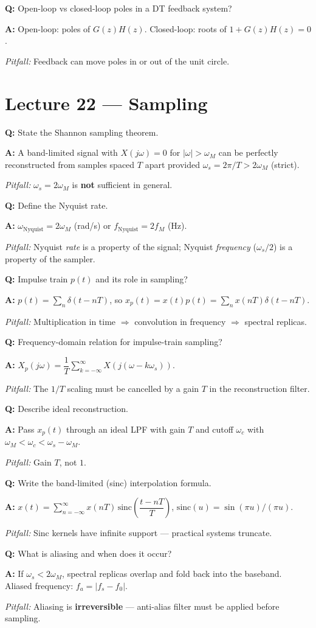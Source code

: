 \documentclass[11pt]{article}
\newcommand{\Q}[1]{\par\medskip\noindent\textbf{Q:} #1}
\newcommand{\A}[1]{\par\noindent\textbf{A:} #1}
\newcommand{\Pit}[1]{\par\noindent\textit{Pitfall:} #1}
\begin{document}
\Q{Open-loop vs closed-loop poles in a DT feedback system?}
\A{Open-loop: poles of $G(z)H(z)$. Closed-loop: roots of $1+G(z)H(z)=0$.}
\Pit{Feedback can move poles in or out of the unit circle.}

\section{Lecture 22 --- Sampling}

\Q{State the Shannon sampling theorem.}
\A{A band-limited signal with $X(j\omega)=0$ for $|\omega|>\omega_M$ can be perfectly reconstructed from samples spaced $T$ apart provided $\omega_s = 2\pi/T > 2\omega_M$ (strict).}
\Pit{$\omega_s = 2\omega_M$ is \textbf{not} sufficient in general.}

\Q{Define the Nyquist rate.}
\A{$\omega_{\text{Nyquist}} = 2\omega_M$ (rad/s) or $f_{\text{Nyquist}} = 2f_M$ (Hz).}
\Pit{Nyquist \emph{rate} is a property of the signal; Nyquist \emph{frequency} ($\omega_s/2$) is a property of the sampler.}

\Q{Impulse train $p(t)$ and its role in sampling?}
\A{$p(t) = \sum_n \delta(t-nT)$, so $x_p(t) = x(t)p(t) = \sum_n x(nT)\delta(t-nT)$.}
\Pit{Multiplication in time $\Rightarrow$ convolution in frequency $\Rightarrow$ spectral replicas.}

\Q{Frequency-domain relation for impulse-train sampling?}
\A{$X_p(j\omega) = \dfrac{1}{T}\displaystyle\sum_{k=-\infty}^{\infty} X(j(\omega-k\omega_s))$.}
\Pit{The $1/T$ scaling must be cancelled by a gain $T$ in the reconstruction filter.}

\Q{Describe ideal reconstruction.}
\A{Pass $x_p(t)$ through an ideal LPF with gain $T$ and cutoff $\omega_c$ with $\omega_M < \omega_c < \omega_s-\omega_M$.}
\Pit{Gain $T$, not $1$.}

\Q{Write the band-limited (sinc) interpolation formula.}
\A{$x(t) = \displaystyle\sum_{n=-\infty}^{\infty} x(nT)\,\text{sinc}\!\left(\dfrac{t-nT}{T}\right)$, $\text{sinc}(u)=\sin(\pi u)/(\pi u)$.}
\Pit{Sinc kernels have infinite support --- practical systems truncate.}

\Q{What is aliasing and when does it occur?}
\A{If $\omega_s<2\omega_M$, spectral replicas overlap and fold back into the baseband. Aliased frequency: $f_a = |f_s-f_0|$.}
\Pit{Aliasing is \textbf{irreversible} --- anti-alias filter must be applied before sampling.}
\end{document}
